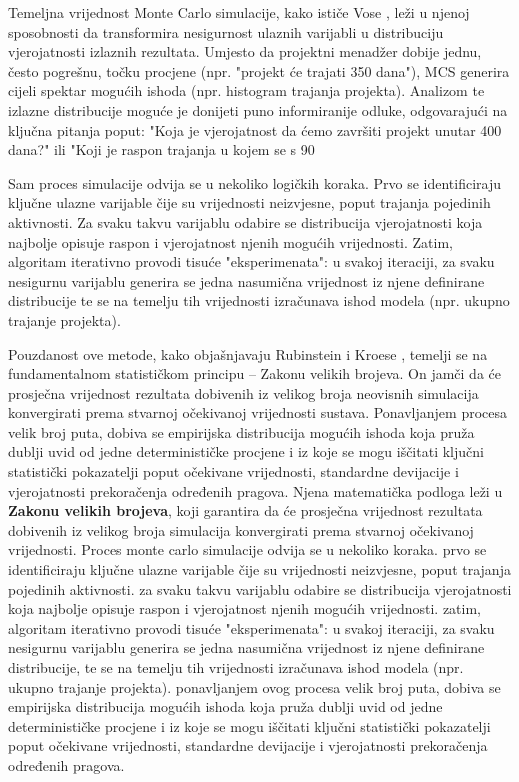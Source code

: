 Temeljna vrijednost Monte Carlo simulacije, kako ističe Vose \cite{Vose2008}, leži u njenoj sposobnosti da transformira nesigurnost ulaznih varijabli u distribuciju vjerojatnosti izlaznih rezultata. Umjesto da projektni menadžer dobije jednu, često pogrešnu, točku procjene (npr. "projekt će trajati 350 dana"), MCS generira cijeli spektar mogućih ishoda (npr. histogram trajanja projekta). Analizom te izlazne distribucije moguće je donijeti puno informiranije odluke, odgovarajući na ključna pitanja poput: "Koja je vjerojatnost da ćemo završiti projekt unutar 400 dana?" ili "Koji je raspon trajanja u kojem se s 90%

Sam proces simulacije odvija se u nekoliko logičkih koraka. Prvo se identificiraju ključne ulazne varijable čije su vrijednosti neizvjesne, poput trajanja pojedinih aktivnosti. Za svaku takvu varijablu odabire se distribucija vjerojatnosti koja najbolje opisuje raspon i vjerojatnost njenih mogućih vrijednosti. Zatim, algoritam iterativno provodi tisuće "eksperimenata": u svakoj iteraciji, za svaku nesigurnu varijablu generira se jedna nasumična vrijednost iz njene definirane distribucije te se na temelju tih vrijednosti izračunava ishod modela (npr. ukupno trajanje projekta).

Pouzdanost ove metode, kako objašnjavaju Rubinstein i Kroese \cite{Rubinstein2016}, temelji se na fundamentalnom statističkom principu – Zakonu velikih brojeva. On jamči da će prosječna vrijednost rezultata dobivenih iz velikog broja neovisnih simulacija konvergirati prema stvarnoj očekivanoj vrijednosti sustava. Ponavljanjem procesa velik broj puta, dobiva se empirijska distribucija mogućih ishoda koja pruža dublji uvid od jedne determinističke procjene i iz koje se mogu iščitati ključni statistički pokazatelji poput očekivane vrijednosti, standardne devijacije i vjerojatnosti prekoračenja određenih pragova.
Njena matematička podloga leži u \textbf{Zakonu velikih brojeva}, koji garantira da će prosječna vrijednost rezultata dobivenih iz velikog broja simulacija konvergirati prema stvarnoj očekivanoj vrijednosti.
Proces monte carlo simulacije odvija se u nekoliko koraka. prvo se identificiraju ključne ulazne varijable čije su vrijednosti neizvjesne, poput trajanja pojedinih aktivnosti. za svaku takvu varijablu odabire se distribucija vjerojatnosti koja najbolje opisuje raspon i vjerojatnost njenih mogućih vrijednosti. zatim, algoritam iterativno provodi tisuće "eksperimenata": u svakoj iteraciji, za svaku nesigurnu varijablu generira se jedna nasumična vrijednost iz njene definirane distribucije, te se na temelju tih vrijednosti izračunava ishod modela (npr. ukupno trajanje projekta). ponavljanjem ovog procesa velik broj puta, dobiva se empirijska distribucija mogućih ishoda koja pruža dublji uvid od jedne determinističke procjene i iz koje se mogu iščitati ključni statistički pokazatelji poput očekivane vrijednosti, standardne devijacije i vjerojatnosti prekoračenja određenih pragova.

